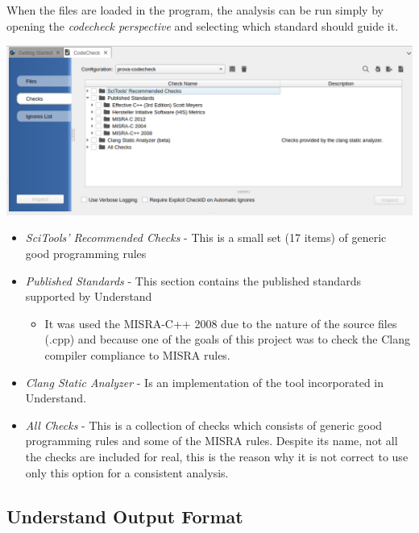 When the files are loaded in the program, the analysis can be run simply by opening the \textsl{codecheck perspective} and selecting which standard should guide it.\newline\newline
\vspace{1cm}
\begin{minipage}{\linewidth}
	\includegraphics[width=\textwidth]{img/Codecheck.png}
\end{minipage}

\begin{itemize}
	\item \textsl{SciTools' Recommended Checks} - This is a small set (17 items) of generic good programming rules
	\item \textsl{Published Standards} - This section contains the published standards supported by Understand
		\begin{itemize}
			\item It was used the MISRA-C++ 2008 due to the nature of the source files (.cpp) and because one of the goals of this project was to check the Clang compiler compliance to MISRA rules.
		\end{itemize}
	\item \textsl{Clang Static Analyzer} - Is an implementation of the tool incorporated in Understand.
	\item \textsl{All Checks} - This is a collection of checks which consists of generic good programming rules and some of the MISRA rules. Despite its name, not all the checks are included for real, this is the reason why it is not correct to use only this option for a consistent analysis.
\end{itemize}

\subsection{Understand Output Format}

